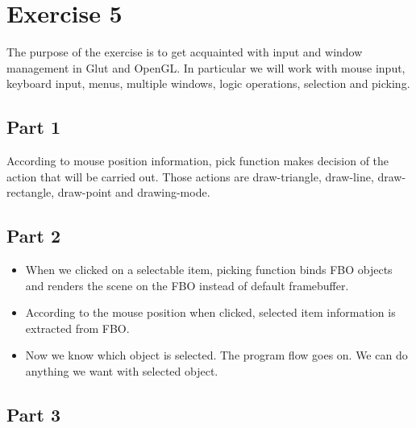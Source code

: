 \chapter{Exercise 5}
\label{cha:ugeopgave-5}

The purpose of the exercise is to get acquainted with input and window management in Glut and OpenGL. In particular we will work with mouse input, keyboard input, menus, multiple windows, logic operations, selection and picking.

\section{Part 1}
\label{sec:del-1}
According to mouse position information, pick function makes decision of the action that will be carried out.
Those actions are draw-triangle, draw-line, draw-rectangle, draw-point and drawing-mode.



\section{Part 2}
\label{sec:del-2}

\begin{itemize}
  \item When we clicked on a selectable item, picking function binds FBO objects and renders the scene on the FBO instead of default framebuffer.
  \item According to the mouse position when clicked, selected item information is extracted from FBO.
  \item Now we know which object is selected. The program flow goes on. We can do anything we want with selected object.
\end{itemize}


\section{Part 3}
\label{sec:del-3}

